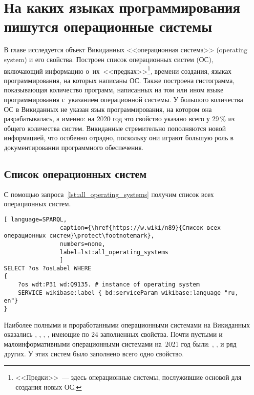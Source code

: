 \chapter{На каких языках программирования пишутся операционные системы}
\label{ch:operating-sysmets}

В главе исследуется объект Викиданных <<операционная система>> (operating system) и его свойства. 
Построен список операционных систем (ОС), включающий информацию о~их~<<предках>>\footnote{%
%
<<Предки>>~--- здесь операционные системы, послужившие основой для создания новых ОС.%
%
}, 
времени создания, языках программирования, на которых написаны ОС. 
Также построена гистограмма, показывающая количество программ, 
написанных на том или ином языке программирования с~указанием операционной системы. 
У большого количества ОС в Викиданных не указан язык программирования, 
на котором она разрабатывалась, а именно: 
на 2020 год это свойство указано всего у 29\,\% из общего количества систем. 
Викиданные стремительно пополняются новой информацией, что особенно отрадно, 
поскольку они играют большую роль в документировании программного обеспечения.



\section{Список операционных систем}
С помощью запроса~\ref{lst:all_operating_systems} получим список всех операционных систем.
\begin{lstlisting}[ language=SPARQL, 
                caption={\href{https://w.wiki/n89}{Список всех операционных систем}\protect\footnotemark},
                numbers=none,
                label=lst:all_operating_systems
	            ]
SELECT ?os ?osLabel WHERE
{
    ?os wdt:P31 wd:Q9135. # instance of operating system
    SERVICE wikibase:label { bd:serviceParam wikibase:language "ru, en"}
}
\end{lstlisting}


Наиболее полными и проработанными операционными системами на Викиданных оказались 
, 
, 
, 
, имеющие по 24 заполненных свойства\autocite{prowd_os_link}.
Почти пустыми и малоинформативными операционными системами на~2021 год были: 
, ,  и ряд других. 
У этих систем было заполнено всего одно свойство\autocite{prowd_os_link}.

